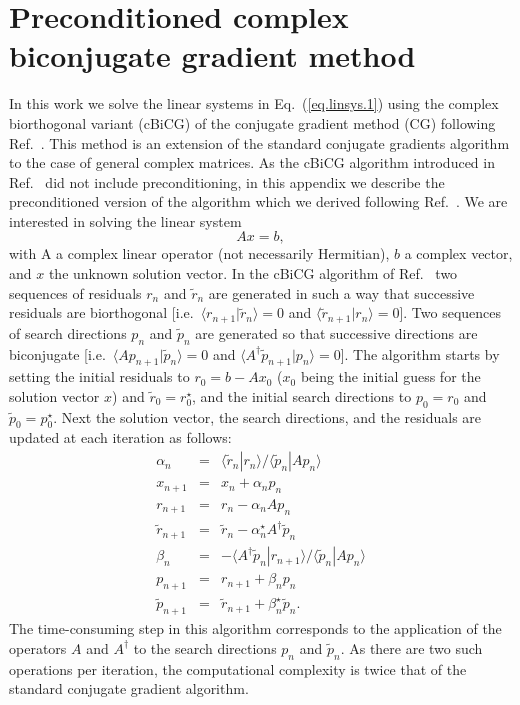 \documentclass[twocolumn,prb,showpacs,superscriptaddress]{revtex4}
\def\>{\rangle}
\def\<{\langle}
\def\rt{\tilde{r}}
\def\pt{\tilde{p}}
\begin{document}
\appendix

\section{Preconditioned complex biconjugate gradient method}\label{app.cbcg}

In this work we solve the linear systems in Eq.\ (\ref{eq.linsys.1}) 
using the complex biorthogonal variant (cBiCG) of the conjugate gradient method (CG)
following Ref.\ . This method is an extension of the standard
conjugate gradients algorithm to the
case of general complex matrices.
As the cBiCG algorithm introduced in Ref.\  
did not include preconditioning, in this appendix we describe 
the preconditioned version of the algorithm which we derived 
following Ref.~.
%
We are interested in solving the linear system
  \begin{equation}\label{eq.axeqb}
  Ax=b,
  \end{equation}
with A a complex linear operator (not necessarily Hermitian), $b$ a complex 
vector, and $x$ the unknown solution vector.
In the cBiCG algorithm of Ref.\  two sequences of residuals $r_n$ and
$\rt_n$ are generated in such a way that successive residuals 
are biorthogonal [i.e.\ $\<r_{n+1}|\rt_n\>=0$ and $\<\rt_{n+1}|r_n\>=0$].
Two sequences of search directions 
$p_n$ and $\pt_n$ are generated so that successive directions
are biconjugate [i.e.\ $\< A p_{n+1}|\pt_n \> =0$ and 
$\< A^\dagger \pt_{n+1}|p_n \> =0$].
The algorithm starts by setting the initial residuals to
$r_0 = b-Ax_0$ ($x_0$ being the initial guess for the solution vector $x$) 
and $\rt_0=r_0^\star$, and the initial search directions to $p_0=r_0$ 
and $\pt_0=p_0^\star$. Next the solution
vector, the search directions, and the residuals are updated at each
iteration as follows:
  \begin{eqnarray}
  \alpha_n & = & \<\rt_n|r_n\>/\<\pt_n|Ap_n\> \label{eq.cg1}  \\ 
  x_{n+1} & = & x_n + \alpha_n p_n \label{eq.cg2} \\ 
  r_{n+1} & = & r_n - \alpha_n Ap_n \label{eq.cg3} \\ 
  \rt_{n+1} & = & \rt_n - \alpha_n^\star A^\dagger \pt_n \label{eq.cg4}\\ 
  \beta_n & = & - \<A^\dagger\pt_n|r_{n+1}\>/\<\pt_n|Ap_n\> \label{eq.cg5}\\ 
  p_{n+1} & = & r_{n+1} + \beta_n p_n \label{eq.cg6}\\ 
  \pt_{n+1} & = & \rt_{n+1} + \beta_n^\star \label{eq.cg7} \pt_n. 
  \end{eqnarray}
The time-consuming step in this algorithm corresponds to the application of the operators
$A$ and $A^\dagger$ to the search directions $p_n$ and $\pt_n$. 
As there are two such operations per iteration, the computational complexity 
is twice that of the standard conjugate gradient algorithm.
\end{document}
